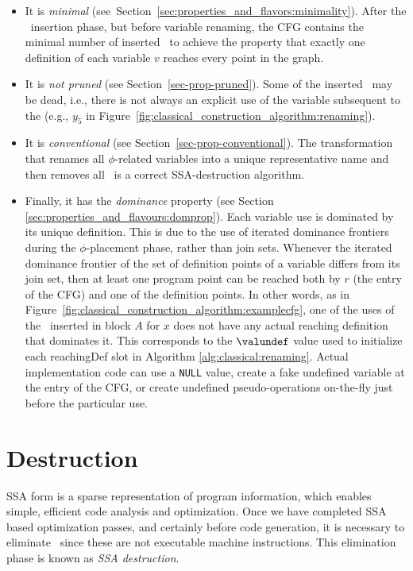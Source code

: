 {\begin{itemize}
\item It is \textit{minimal} (see~Section~\ref{sec:properties_and_flavors:minimality}).
After the \phifun\ insertion phase,
but before variable renaming, the CFG contains the minimal 
number of inserted \phifuns\ to achieve the property that exactly
one definition of each variable $v$ reaches every point in the graph.
\item It is \textit{not pruned} (see Section~\ref{sec-prop-pruned}).
Some of the inserted \phifuns\
may be dead, i.e., there is not always an explicit use of the variable subsequent
to the \phifun (e.g., $y_5$ in Figure~\ref{fig:classical_construction_algorithm:renaming}).
\item It is \textit{conventional} (see Section~\ref{sec-prop-conventional}).
The transformation that renames all $\phi$-related variables into a
unique representative name and then removes all \phifuns\ is a correct SSA-destruction algorithm.
\item Finally, it has the \textit{dominance} property (see Section
\ref{sec:properties_and_flavours:domprop}).\index{strict SSA form}
Each variable use is dominated by its unique definition. 
This is due to the use of iterated dominance frontiers
during the $\phi$-placement phase,
rather than join sets. Whenever the iterated dominance frontier
of the set of definition points of a variable differs from its join
set, then at least one program point can be reached both by $r$ (the
entry of the CFG) and one of the definition points. In other words, as
in Figure~\ref{fig:classical_construction_algorithm:examplecfg}, one
of the uses of the \phifun\ inserted in block $A$ for $x$ does not have
any actual reaching definition that dominates it. This corresponds to
the $\valundef$ value used to initialize each reachingDef slot in Algorithm
\ref{alg:classical:renaming}.
Actual implementation code can use a \texttt{NULL} value, create a
fake undefined variable at the entry of the CFG, or create
undefined pseudo-operations on-the-fly just before the particular use.
\end{itemize}


\section{Destruction}
\label{sec:classical_construction_algorithm:destruction}
SSA form is a sparse representation of program information,
which enables simple, efficient code analysis and optimization.
Once we have completed SSA based optimization passes,
and certainly before code generation,
it is necessary to eliminate \phifuns\ since these
are not executable machine instructions.
This elimination phase is known as \textit{SSA destruction}. 

}
